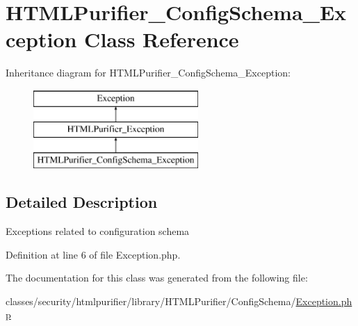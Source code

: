 \hypertarget{classHTMLPurifier__ConfigSchema__Exception}{\section{H\+T\+M\+L\+Purifier\+\_\+\+Config\+Schema\+\_\+\+Exception Class Reference}
\label{classHTMLPurifier__ConfigSchema__Exception}
}
Inheritance diagram for H\+T\+M\+L\+Purifier\+\_\+\+Config\+Schema\+\_\+\+Exception\+:\begin{figure}[H]
\begin{center}
\leavevmode
\includegraphics[height=3.000000cm]{classHTMLPurifier__ConfigSchema__Exception}
\end{center}
\end{figure}


\subsection{Detailed Description}
Exceptions related to configuration schema 

Definition at line 6 of file Exception.\+php.



The documentation for this class was generated from the following file\+:\begin{DoxyCompactItemize}
\item 
classes/security/htmlpurifier/library/\+H\+T\+M\+L\+Purifier/\+Config\+Schema/\hyperlink{ConfigSchema_2Exception_8php}{Exception.\+php}\end{DoxyCompactItemize}
